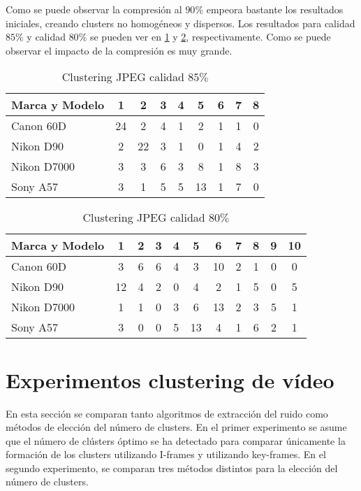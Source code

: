 Como se puede observar la compresión al $90\%$ empeora bastante los resultados iniciales, creando clusters no homogéneos y dispersos. Los resultados para calidad $85\%$ y calidad $80\%$ se pueden ver en \ref{tabla:compresion85} y \ref{tabla:compresion80}, respectivamente. Como se puede observar el impacto de la compresión es muy grande.

\begin{table}[!htb]
    \centering
        \begin{tabular}{|l|c|c|c|c|c|c|c|c|}
        \hline
        \rowcolor[gray]{0.9}
        \textbf{Marca y Modelo} & 1 & 2 & 3 & 4 & 5 & 6 & 7 & 8 \\ \hline
        Canon 60D & 24 & 2 & 4 & 1 & 2 & 1 & 1 & 0 \\ \hline
        Nikon D90 & 2 & 22 & 3 & 1 & 0 & 1 & 4 & 2 \\ \hline
        Nikon D7000 & 3 & 3 & 6 & 3 & 8 & 1 & 8 & 3 \\ \hline
        Sony A57 & 3 & 1 & 5 & 5 & 13 & 1 & 7 & 0 \\ \hline
        \end{tabular}
    \caption{Clustering JPEG calidad $85\%$}
    \label{tabla:compresion85}
\end{table}

\begin{table}[!htb]
    \centering
        \begin{tabular}{|l|c|c|c|c|c|c|c|c|c|c|}
        \hline
        \rowcolor[gray]{0.9}
        \textbf{Marca y Modelo} & 1 & 2 & 3 & 4 & 5 & 6 & 7 & 8 & 9 & 10\\ \hline
        Canon 60D & 3 & 6 & 6 & 4 & 3 & 10 & 2 & 1 & 0 & 0 \\ \hline
        Nikon D90 & 12 & 4 & 2 & 0 & 4 & 2 & 1 & 5 & 0 & 5 \\ \hline
        Nikon D7000 & 1 & 1 & 0 & 3 & 6 & 13 & 2 & 3 & 5 & 1 \\ \hline
        Sony A57 & 3 & 0 & 0 & 5 & 13 & 4 & 1 & 6 & 2 & 1 \\ \hline
        \end{tabular}
    \caption{Clustering JPEG calidad $80\%$}
    \label{tabla:compresion80}
\end{table}

\section{Experimentos clustering de vídeo}

En esta sección se comparan tanto algoritmos de extracción del ruido como métodos de elección del número de clusters. En el primer experimento se asume que el número de clústers óptimo se ha detectado para comparar únicamente la formación de los clusters utilizando I-frames y utilizando key-frames. En el segundo experimento, se comparan tres métodos distintos para la elección del número de clusters. \\

